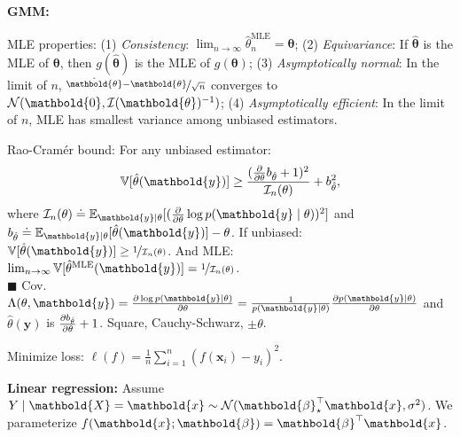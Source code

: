 \documentclass[9pt]{extarticle}
\newenvironment{topic}[1]
{\textbf{\sffamily \colorbox{black}{\rlap{\textbf{\textcolor{white}{#1}}}\hspace{\linewidth}\hspace{-2\fboxsep}}}}
{}
\newenvironment{subtopic}[1]
{\textbf{\sffamily #1:}}
{}
\renewcommand{\vec}[1]{\ensuremath{\mathbold{#1}}}
\renewcommand{\Var}{\mathbb{V}}
\begin{document}
\begin{multicols*}{3}
\begin{topic}{Anomaly detection}
\begin{subtopic}{GMM}
        \end{subtopic}

    \end{topic}

    \begin{topic}{Density estimation}
        MLE properties: (1) \textit{Consistency}: $\lim_{n\to\infty} \hat{\theta}^{\mathrm{MLE}}_n =
            \vec{\theta}$; (2) \textit{Equivariance}: If $\hat{\vec{\theta}}$ is the MLE of $\vec{\theta}$,
        then $g(\hat{\vec{\theta}})$ is the MLE of $g(\vec{\theta})$; (3) \textit{Asymptotically normal}:
        In the limit of $n$, $\nicefrac{\hat{\vec{\theta}} - \vec{\theta}}{\sqrt{n}}$ converges to
        $\mathcal{N}(\vec{0}, \inv{\mathcal{I}(\vec{\theta})})$; (4) \textit{Asymptotically efficient}: In
        the limit of $n$, MLE has smallest variance among unbiased estimators.

        Rao-Cram\'er bound: For any unbiased estimator: \[
            \Var[\hat{\theta}(\vec{y})] \geq \frac{(\pdv*{b_{\hat{\theta}}}{\theta} + 1)^2}{\mathcal{I}_n(\theta)} + b^2_{\hat{\theta}},
        \]
        where $\mathcal{I}_n(\theta) \doteq \E_{\vec{y} \mid \theta}[(\pdv*{\log p(\vec{y} \mid
                    \theta)}{\theta})^2]$ and $b_{\hat{\theta}} \doteq \E_{\vec{y}\mid \theta}[\hat{\theta}(\vec{y})] -
            \theta$. If unbiased: $\Var[\hat{\theta}(\vec{y})] \geq \nicefrac{1}{\mathcal{I}_n(\theta)}$. And
        MLE: $\lim_{n\to \infty} \Var[\hat{\theta}^{\mathrm{MLE}}(\vec{y})] =
            \nicefrac{1}{\mathcal{I}_n(\theta)}$. \\ $\blacksquare$ Cov.\ $\Lambda(\theta, \vec{y}) = \pdv{\log
                p(\vec{y} \mid \theta)}{\theta} = \frac{1}{p(\vec{y} \mid \theta)} \pdv{p(\vec{y} \mid
                \theta)}{\theta}$ and $\hat{\theta}(\vec{y})$ is $\pdv{b_{\hat{\theta}}}{\theta} + 1$. Square,
        Cauchy-Schwarz, $\pm \theta$.
    \end{topic}

    \begin{topic}{Regression}
        Minimize loss: $\ell(f) = \frac{1}{n} \sum_{i=1}^{n} (f(\vec{x}_i) - y_i)^2$.

        \begin{subtopic}{Linear regression}
            Assume $Y \mid \vec{X} = \vec{x} \sim \mathcal{N}(\transpose{\vec{\beta}_\star} \vec{x},
                \sigma^2)$. We parameterize $f(\vec{x}; \vec{\beta}) = \transpose{\vec{\beta}} \vec{x}$.


\end{subtopic}
\end{topic}
\end{multicols*}
\end{document}
